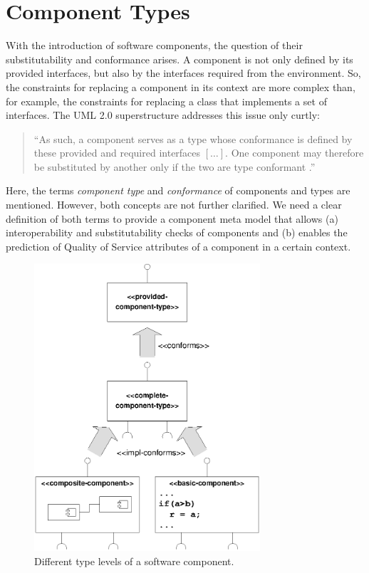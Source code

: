 \section{Component Types}
\label{sec:ComponentTypes}
With the introduction of software components, the question of their
substitutability and conformance arises. A component is not only defined by its
provided interfaces, but also by the interfaces required from the environment.
So, the constraints for replacing a component in its context are more complex
than, for example, the constraints for replacing a class that implements a set
of interfaces. The UML 2.0 superstructure addresses this issue only curtly:

\begin{quote}
``As such, a component serves as a type whose conformance is defined by these
provided and required interfaces $[\ldots]$. One component may therefore be
substituted by another only if the two are type conformant
\cite[p.142]{OMGUML2005a}.''
\end{quote}

Here, the terms \emph{component type} and \emph{conformance} of components and
types are mentioned. However, both concepts are not further clarified. We need a
clear definition of both terms to provide a component meta model that allows (a)
 interoperability and substitutability checks of components and (b) enables the
prediction of Quality of Service attributes of a component in a certain context.

\begin{figure}[htbp]
\centering
\includegraphics[width=3.3in]{example/Overview_TypeHierarchie}
\caption{Different type levels of a software component.}
\label{fig:TypeOverview}
\end{figure}


